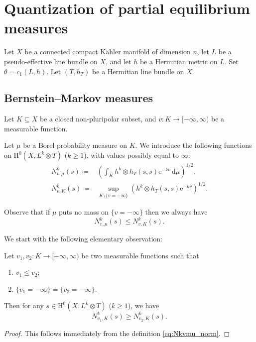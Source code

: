 \section{Quantization of partial equilibrium measures}\label{sec:quant}


Let $X$ be a connected compact K\"ahler manifold of dimension $n$, let $L$ be a pseudo-effective line bundle on $X$, and let $h$ be a Hermitian metric on $L$. Set $\theta=c_1(L,h)$. Let $(T,h_T)$ be a Hermitian line bundle on $X$.

\subsection{Bernstein--Markov measures}
\label{subsec:BM}
Let $K\subseteq X$ be a closed non-pluripolar subset, and $v\colon K\rightarrow [-\infty,\infty)$ be a measurable function.

\begin{definition}\label{def:Bergman:L706}
    Let $\mu$ be a Borel probability measure on $K$.
We introduce the following functions on $\mathrm{H}^0(X,L^k \otimes T)$ ($k\geq 1$), with values possibly equal to $\infty$:
\begin{equation}\label{eq:Nkvmu_norm}
\begin{aligned}
N^k_{v,\mu}(s) \coloneqq & \left(\int_K h^k \otimes h_T(s,s) \mathrm{e}^{-kv} \,\mathrm{d}\mu\right)^{1/2},\\
N^k_{v,K}(s) \coloneqq & \sup_{K\setminus \{v=-\infty\}} \left( h^k \otimes h_T(s,s)\mathrm{e}^{-kv}\right)^{1/2}.
\end{aligned}
\end{equation}
\end{definition}
Observe that if $\mu$ puts no mass on $\{v=-\infty\}$ then we always have
\begin{equation}\label{eq:Nkinfcomp}
N^k_{v,\mu}(s)\leq N^k_{v,K}(s).
\end{equation}


We start with the following elementary observation:
\begin{lemma}\label{lma:mononorm}
Let $v_1,v_2\colon K\rightarrow [-\infty,\infty)$ be two measurable functions such that
\begin{enumerate}
    \item\label{itm:lma:mononorm:1} $v_1\leq v_2$;
    \item\label{itm:lma:mononorm:2} $\{v_1=-\infty\}=\{v_2=-\infty\}$.
\end{enumerate}
Then for any $s\in \mathrm{H}^0(X,L^k\otimes T)$ ($k\geq 1$), we have
\[
N_{v_1,K}^k(s)\geq N_{v_2,K}^k(s).
\]
\end{lemma}
\begin{proof}
    This follows immediately from the definition \eqref{eq:Nkvmu_norm}.
\end{proof}






